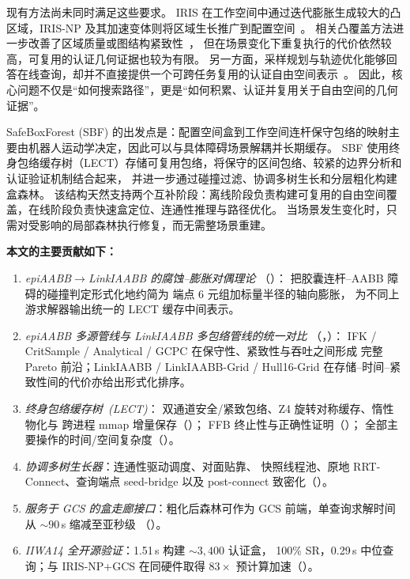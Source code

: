 \documentclass[journal]{IEEEtran}
\begin{document}
现有方法尚未同时满足这些要求。
IRIS 在工作空间中通过迭代膨胀生成较大的凸区域，IRIS-NP 及其加速变体则将区域生长推广到配置空间~\cite{deits2015computing,werner2024fast,werner2024irisze}。
相关凸覆盖方法进一步改善了区域质量或图结构紧致性~\cite{amice2024clique,werner2024vcd}，
但在场景变化下重复执行的代价依然较高，可复用的认证几何证据也较为有限。
另一方面，采样规划与轨迹优化能够回答在线查询，却并不直接提供一个可跨任务复用的认证自由空间表示~\cite{lavalle1998rapidly,kuffner2000rrt,gammell2020batch,ratliff2009chomp,schulman2014motion,toussaint2017newton}。
因此，核心问题不仅是“如何搜索路径”，更是“如何积累、认证并复用关于自由空间的几何证据”。

SafeBoxForest (SBF) 的出发点是：配置空间盒到工作空间连杆保守包络的映射主要由机器人运动学决定，因此可以与具体障碍场景解耦并长期缓存。
SBF 使用终身包络缓存树（LECT）存储可复用包络，将保守的区间包络、较紧的边界分析和认证验证机制结合起来，
并进一步通过碰撞过滤、协调多树生长和分层粗化构建盒森林。
该结构天然支持两个互补阶段：离线阶段负责构建可复用的自由空间覆盖，在线阶段负责快速盒定位、连通性推理与路径优化。
当场景发生变化时，只需对受影响的局部森林执行修复，而无需整场景重建。

\textbf{本文的主要贡献如下：}
\begin{enumerate}[nosep]
  \item \emph{epiAABB$\to$LinkIAABB 的腐蚀--膨胀对偶理论}
  （）：
  把胶囊连杆--AABB 障碍的碰撞判定形式化地约简为
  端点 6 元组加标量半径的轴向膨胀，
  为不同上游求解器输出统一的 LECT 缓存中间表示。

  \item \emph{epiAABB 多源管线与 LinkIAABB 多包络管线的统一对比}
  （，）：
  IFK / CritSample / Analytical / GCPC 在保守性、紧致性与吞吐之间形成
  完整 Pareto 前沿；LinkIAABB / LinkIAABB-Grid / Hull16-Grid
  在存储--时间--紧致性间的代价亦给出形式化排序。

  \item \emph{终身包络缓存树~(LECT)}：
  双通道安全/紧致包络、Z4 旋转对称缓存、惰性物化与
  跨进程 mmap 增量保存（）；
  FFB 终止性与正确性证明（）；
  全部主要操作的时间/空间复杂度（）。

  \item \emph{协调多树生长器}：连通性驱动调度、对面贴靠、
  快照线程池、原地 RRT-Connect、查询端点 seed-bridge
  以及 post-connect 致密化（）。

  \item \emph{服务于 GCS 的盒走廊接口}：粗化后森林可作为
  GCS 前端，单查询求解时间从 $\sim\!90$\,s 缩减至亚秒级
  （）。

  \item \emph{IIWA14 全开源验证}：1.51\,s 构建 $\sim\!3{,}400$ 认证盒，
  100\% SR，0.29\,s 中位查询；与 IRIS-NP+GCS 在同硬件取得 $83\times$
  预计算加速（）。
\end{enumerate}
\end{document}

